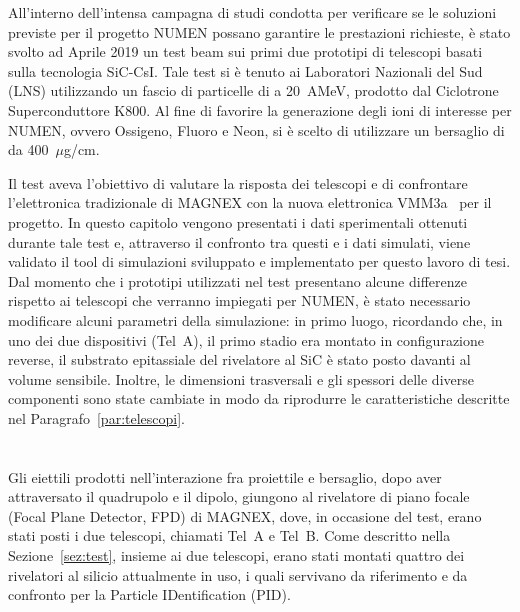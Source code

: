 
All'interno dell'intensa campagna di studi condotta per verificare se le soluzioni previste per il progetto NUMEN possano garantire le prestazioni richieste, è stato svolto ad Aprile 2019 un test beam sui primi due prototipi di telescopi basati sulla tecnologia SiC-CsI.
Tale test si è tenuto ai Laboratori Nazionali del Sud (LNS) utilizzando un fascio di particelle di  a 20~AMeV, prodotto dal Ciclotrone Superconduttore K800.
Al fine di favorire la generazione degli ioni di interesse per NUMEN, ovvero Ossigeno, Fluoro e Neon, si è scelto di utilizzare un bersaglio di  da 400~$\mu$g/cm.

Il test aveva l'obiettivo di valutare la risposta dei telescopi e di confrontare l'elettronica tradizionale di MAGNEX con la nuova elettronica VMM3a~\cite{degeronimo:ieee13} per il progetto.
In questo capitolo vengono presentati i dati sperimentali ottenuti durante tale test e, attraverso il confronto tra questi e i dati simulati, viene validato il tool di simulazioni sviluppato e implementato per questo lavoro di tesi.
Dal momento che i prototipi utilizzati nel test presentano alcune differenze rispetto ai telescopi che verranno impiegati per NUMEN, è stato necessario modificare alcuni parametri della simulazione: in primo luogo, ricordando che, in uno dei due dispositivi (Tel~A), il primo stadio era montato in configurazione reverse, il substrato epitassiale del rivelatore al SiC è stato posto davanti al volume sensibile.
Inoltre, le dimensioni trasversali e gli spessori delle diverse componenti sono state cambiate in modo da riprodurre le caratteristiche descritte nel Paragrafo~\ref{par:telescopi}.


\section{}


Gli eiettili prodotti nell'interazione fra proiettile e bersaglio, dopo aver attraversato il quadrupolo e il dipolo, giungono al rivelatore di piano focale (Focal Plane Detector, FPD) di MAGNEX, dove, in occasione del test, erano stati posti i due telescopi, chiamati Tel~A e Tel~B. 
Come descritto nella Sezione~\ref{sez:test}, insieme ai due telescopi, erano stati montati quattro dei rivelatori al silicio attualmente in uso, i quali servivano da riferimento e da confronto per la Particle IDentification (PID).

